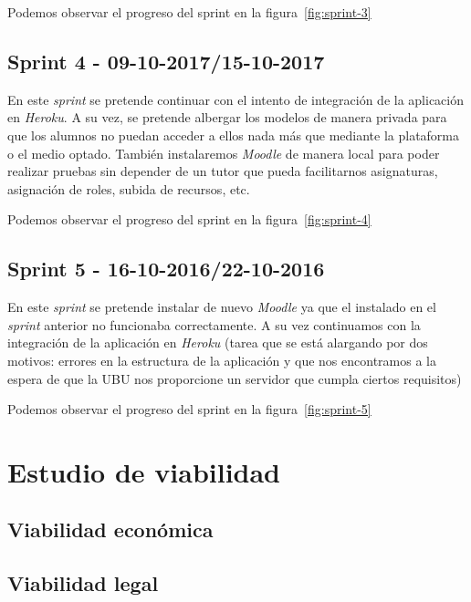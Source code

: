 Podemos observar el progreso del sprint en la figura~\ref{fig:sprint-3}

\subsection{Sprint 4 - 09-10-2017/15-10-2017}
En este \textit{sprint} se pretende continuar con el intento de integración de la aplicación en \textit{Heroku}. A su vez, se pretende albergar los modelos de manera privada para que los alumnos no puedan acceder a ellos nada más que mediante la plataforma o el medio optado. También instalaremos \textit{Moodle} de manera local para poder realizar pruebas sin depender de un tutor que pueda facilitarnos asignaturas, asignación de roles, subida de recursos, etc.

Podemos observar el progreso del sprint en la figura~\ref{fig:sprint-4}

\subsection{Sprint 5 - 16-10-2016/22-10-2016}
En este \textit{sprint} se pretende instalar de nuevo \textit{Moodle} ya que el instalado en el \textit{sprint} anterior no funcionaba correctamente. A su vez continuamos con la integración de la aplicación en \textit{Heroku} (tarea que se está alargando por dos motivos: errores en la estructura de la aplicación y que nos encontramos a la espera de que la UBU nos proporcione un servidor que cumpla ciertos requisitos)

Podemos observar el progreso del sprint en la figura~\ref{fig:sprint-5}


\section{Estudio de viabilidad}

\subsection{Viabilidad económica}

\subsection{Viabilidad legal}


